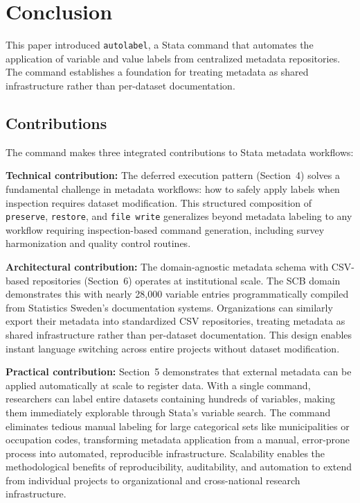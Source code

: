 \section{Conclusion}

This paper introduced \texttt{autolabel}, a Stata command that automates the application of variable and value labels from centralized metadata repositories. The command establishes a foundation for treating metadata as shared infrastructure rather than per-dataset documentation.

\subsection{Contributions}

The command makes three integrated contributions to Stata metadata workflows:

\textbf{Technical contribution:} The deferred execution pattern (Section~4) solves a fundamental challenge in metadata workflows: how to safely apply labels when inspection requires dataset modification. This structured composition of \texttt{preserve}, \texttt{restore}, and \texttt{file write} generalizes beyond metadata labeling to any workflow requiring inspection-based command generation, including survey harmonization and quality control routines.

\textbf{Architectural contribution:} The domain-agnostic metadata schema with CSV-based repositories (Section~6) operates at institutional scale. The SCB domain demonstrates this with nearly 28,000 variable entries programmatically compiled from Statistics Sweden's documentation systems. Organizations can similarly export their metadata into standardized CSV repositories, treating metadata as shared infrastructure rather than per-dataset documentation. This design enables instant language switching across entire projects without dataset modification.

\textbf{Practical contribution:} Section~5 demonstrates that external metadata can be applied automatically at scale to register data. With a single command, researchers can label entire datasets containing hundreds of variables, making them immediately explorable through Stata's variable search. The command eliminates tedious manual labeling for large categorical sets like municipalities or occupation codes, transforming metadata application from a manual, error-prone process into automated, reproducible infrastructure. Scalability enables the methodological benefits of reproducibility, auditability, and automation to extend from individual projects to organizational and cross-national research infrastructure.

